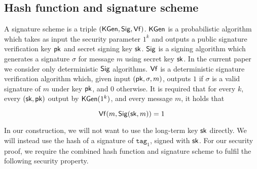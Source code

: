 \documentclass[12pt]{article}
\begin{document}





\subsection{Hash function and signature scheme}
A signature scheme is a triple $(\mathsf{KGen}, \mathsf{Sig}, \mathsf{Vf})$. $\mathsf{KGen}$ is a probabilistic algorithm which takes as input the security parameter $1^k$ and outputs a public signature verification key $\mathsf{pk}$ and secret signing key $\mathsf{sk}$. $\mathsf{Sig}$ is a signing algorithm which generates a signature $\sigma$ for message $m$ using secret key $\mathsf{sk}$. In the current paper we consider only deterministic $\mathsf{Sig}$ algorithms. $\mathsf{Vf}$ is a deterministic signature verification algorithm which, given input $(\mathsf{pk}, \sigma, m)$, outputs $1$ if $\sigma$ is a valid signature of $m$ under key $\mathsf{pk}$, and $0$ otherwise. It is required that for every $k$, every $(\mathsf{sk}, \mathsf{pk})$ output by $\mathsf{KGen} (1^k)$, and every message $m$, it holds that

$$\mathsf{Vf} (m , \mathsf{Sig} ({\mathsf{sk}, m})) = 1$$

In our construction, we will not want to use the long-term key $\mathsf{sk}$ directly. We will instead use the hash of a signature of $\texttt{tag}_1$, signed with $\mathsf{sk}$. For our security proof, we require the combined hash function and signature scheme to fulfil the following  security property.
\end{document}
